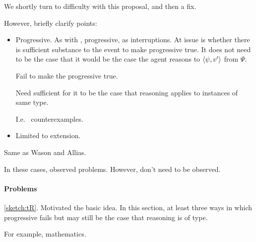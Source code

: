 \begin{note}
  We shortly turn to difficulty with this proposal, and then a fix.

  However, briefly clarify points:

  \begin{itemize}
  \item
    Progressive.
    As with , progressive, as interruptions.
    At issue is whether there is sufficient substance to the event to make progressive true.
    It does not need to be the case that it would be the case the agent reasons to \(\langle \psi, v' \rangle\) from \(\Psi\).

    Fail to make the progressive true.

    Need sufficient for it to be the case that reasoning applies to instances of same type.

    I.e. \ counterexamples.
  \item
    Limited to extension.
  \end{itemize}
\end{note}

\begin{note}
  Same as Wason and Allias.

  In these cases, observed problems.
  However, don't need to be observed.
\end{note}

\paragraph{Problems}
\label{cha:typical:sec:tor:g-s:three-problems}
\nocite{Wilson:1994aa}

\begin{note}
  \autoref{sketch:tR}.
  Motivated the basic idea.
  In this section, at least three ways in which progressive fails but may still be the case that reasoning is of type.
\end{note}

\begin{note}
  For example, mathematics.
\end{note}

